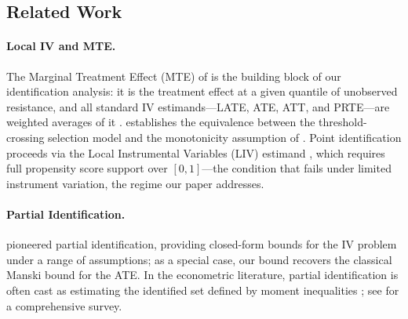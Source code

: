 \subsection{Related Work}\label{subsec:related_work}
\paragraph{Local IV and MTE.}
The Marginal Treatment Effect (MTE) of \citet{heckman1999local,heckman2005structural} is the building block of our identification analysis: it is the treatment effect at a given quantile of unobserved resistance, and all standard IV estimands---LATE, ATE, ATT, and PRTE---are weighted averages of it \citep{heckman2005structural, heckman2006understanding}. \citet{vytlacil2002independence} establishes the equivalence between the threshold-crossing selection model and the monotonicity assumption of \citet{angrist1995identification}. Point identification proceeds via the Local Instrumental Variables (LIV) estimand \citep{heckman1999local}, which requires full propensity score support over $[0,1]$---the condition that fails under limited instrument variation, the regime our paper addresses.


\paragraph{Partial Identification.} \citet{manski1990nonparametric,manski1997monotone,manski_pepper2000monotone} pioneered partial identification, providing closed-form bounds for the IV problem under a range of assumptions; as a special case, our bound recovers the classical Manski bound for the ATE. In the econometric literature, partial identification is often cast as estimating the identified set defined by moment inequalities \citep{chernozhukov_hong_tamer2007}; see \citet{tamer2010partial} for a comprehensive survey.

